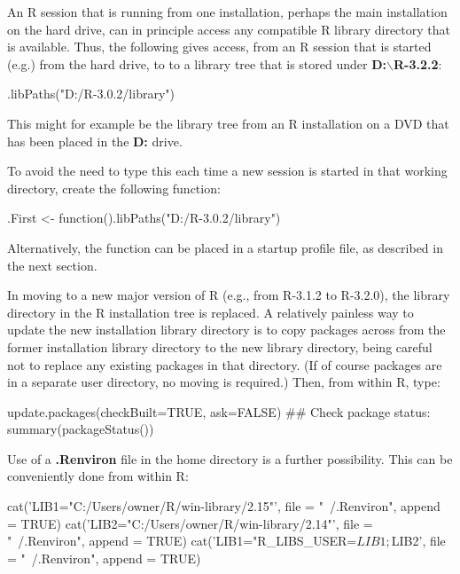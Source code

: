 An R session that is running from one installation, perhaps the main
installation on the hard drive, can in principle access any compatible
R library directory that is available.  Thus, the
following gives access, from an R session that is started (e.g.) from
the hard drive, to to a library tree that is stored under
\textbf{D:$\boldsymbol{\backslash}$R-3.2.2}:
\begin{Schunk}
\begin{Sinput}
.libPaths("D:/R-3.0.2/library")
\end{Sinput}
\end{Schunk}
\noindent
This might for example be the library tree from an R installation on a
DVD that has been placed in the \textbf{D:} drive.

To avoid the need to type this each time a new session is started in
that working directory, create the following function:
\begin{Schunk}
\begin{Sinput}
.First <- function().libPaths("D:/R-3.0.2/library")
\end{Sinput}
\end{Schunk}
\noindent
Alternatively, the function can be placed in a startup profile file,
as described in the next section.

In moving to a new major version of R (e.g., from R-3.1.2 to
R-3.2.0), the library directory in the R installation tree is
replaced.  A relatively painless way to update the new installation
library directory is to copy packages across from the former
installation library directory to the new library directory, being
careful not to replace any existing packages in that directory.  (If
of course packages are in a separate user directory, no moving is
required.)  Then, from within R, type:
\begin{Schunk}
\begin{Sinput}
update.packages(checkBuilt=TRUE, ask=FALSE)
## Check package status:
summary(packageStatus())
\end{Sinput}
\end{Schunk}

Use of a {\bf .Renviron} file in the home directory is a further
possibility. This can be conveniently done from within R:
\begin{Schunk}
\begin{Sinput}
cat('LIB1="C:/Users/owner/R/win-library/2.15"\n',
    file = "~/.Renviron", append = TRUE)
cat('LIB2="C:/Users/owner/R/win-library/2.14"\n',
    file = "~/.Renviron", append = TRUE)
cat('LIB1="R_LIBS_USER=${LIB1};${LIB2}\n',
    file = "~/.Renviron", append = TRUE)
\end{Sinput}
\end{Schunk}

